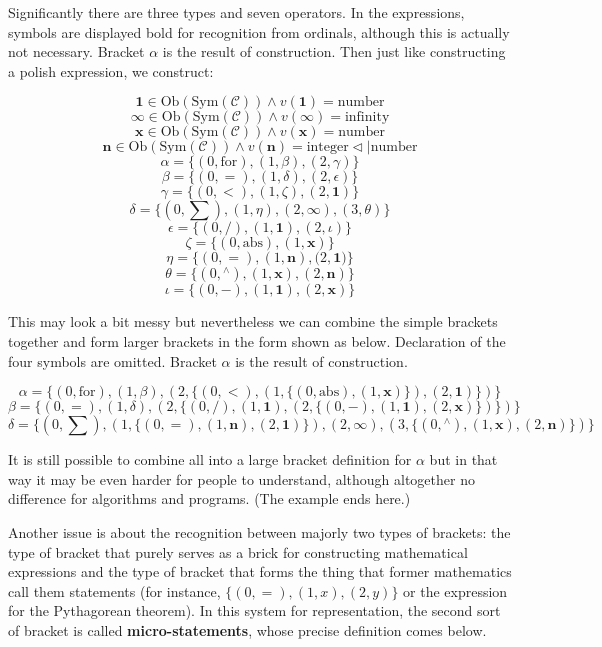 \documentclass{article}
\begin{document}
Significantly there are three types and seven operators. In the expressions, symbols are displayed bold for recognition from ordinals, although this
is actually not necessary. Bracket \(\alpha\) is the result of construction. Then just like constructing a polish expression, we construct:

\[\pmb{1}\in \text{Ob}(\text{Sym}(\mathcal{C}))\land \mathit{v}(\pmb{1})=\text{number}\]
\[\pmb{\infty }\in \text{Ob}(\text{Sym}(\mathcal{C}))\land \mathit{v}(\pmb{\infty })=\text{infinity}\]
\[\pmb{x}\in \text{Ob}(\text{Sym}(\mathcal{C}))\land \mathit{v}(\pmb{x})=\text{number}\]
\[\pmb{n}\in \text{Ob}(\text{Sym}(\mathcal{C}))\land \mathit{v}(\pmb{n})=\text{integer}\triangleleft |\text{number}\]
\[\alpha =\{(0,\text{for}),(1,\beta ),(2,\gamma )\}\]
\[\beta =\{(0,=),(1,\delta ),(2,\epsilon )\}\]
\[\gamma =\{(0,<),(1,\zeta ),(2,\pmb{1})\}\]
\[\delta =\{(0,\sum ),(1,\eta ),(2,\pmb{\infty }), (3,\theta )\}\]
\[\epsilon =\{(0,/),(1,\pmb{1}),(2,\iota )\}\]
\[\zeta =\{(0,\text{abs}),(1,\pmb{x})\}\]
\[\eta =\{(0,=),(1,\pmb{n}),(2,\pmb{1}\pmb{)}\pmb{\}}\]
\[\theta =\{(0,{}^{\wedge}),(1,\pmb{x}),(2,\pmb{n})\}\]
\[\iota =\{(0,-),(1,\pmb{1}),(2,\pmb{x})\}\]

This may look a bit messy but nevertheless we can combine the simple brackets together and form larger brackets in the form shown as below. Declaration of the four symbols are omitted. Bracket \(\alpha\) is the result of construction.

\[\alpha =\{(0,\text{for}),(1,\beta ),(2,\{(0,<),(1,\{(0,\text{abs}),(1,\pmb{x})\}),(2,\pmb{1})\})\}\]
\[\beta =\{(0,=),(1,\delta ),(2,\{(0,/),(1,\pmb{1}),(2,\{(0,-),(1,\pmb{1}),(2,\pmb{x})\})\})\}\]
\[\delta =\{(0,\sum ),(1,\{(0,=),(1,\pmb{n}),(2,\pmb{1})\}),(2,\pmb{\infty }), (3,\{(0,{}^{\wedge}),(1,\pmb{x}),(2,\pmb{n})\})\}\]

It is still possible to combine all into a large bracket definition for \(\alpha\) but in that way it may be even harder for people to understand, although altogether no difference for algorithms and programs. (The example ends here.)

Another issue is about the recognition between majorly two types of brackets: the type of bracket that purely serves as a brick for constructing mathematical expressions and the type of bracket that forms the thing that former mathematics call them statements (for instance, \(\{(0,=),(1,x),(2,y)\}\) or the expression for the Pythagorean theorem). In this system for representation, the second sort of bracket is called \textbf{ micro-statements}, whose precise definition comes below.
\end{document}

